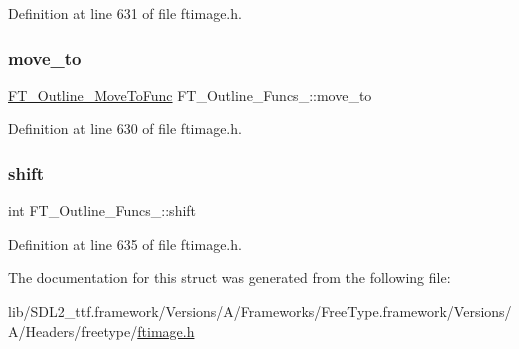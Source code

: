 Definition at line 631 of file ftimage.\+h.

\mbox{\label{struct_f_t___outline___funcs___abd53463a59a1ae2c6998e619c2ab6a65}} 
\subsubsection{\texorpdfstring{move\_to}{move\_to}}
{\footnotesize\ttfamily \mbox{\hyperlink{ftimage_8h_adb1c27eedf361dcd3d331fa266a466af}{F\+T\+\_\+\+Outline\+\_\+\+Move\+To\+Func}} F\+T\+\_\+\+Outline\+\_\+\+Funcs\+\_\+\+::move\+\_\+to}



Definition at line 630 of file ftimage.\+h.

\mbox{\label{struct_f_t___outline___funcs___a540c246669b21b86cb405b3d9019cfda}} 
\subsubsection{\texorpdfstring{shift}{shift}}
{\footnotesize\ttfamily int F\+T\+\_\+\+Outline\+\_\+\+Funcs\+\_\+\+::shift}



Definition at line 635 of file ftimage.\+h.



The documentation for this struct was generated from the following file\+:\begin{DoxyCompactItemize}
\item 
lib/\+S\+D\+L2\+\_\+ttf.\+framework/\+Versions/\+A/\+Frameworks/\+Free\+Type.\+framework/\+Versions/\+A/\+Headers/freetype/\mbox{\hyperlink{ftimage_8h}{ftimage.\+h}}\end{DoxyCompactItemize}
